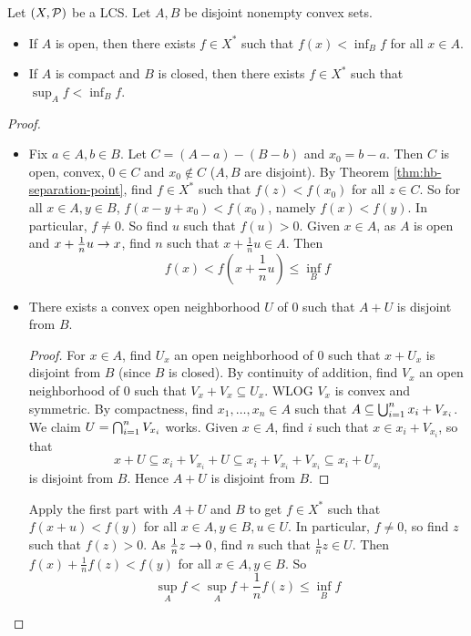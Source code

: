 \documentclass{article}
\begin{document}
\begin{nthm}\label{thm:hb-separation-set}
  Let $(X, \mathcal P)$ be a LCS. Let $A, B$ be disjoint nonempty convex sets.
  \begin{itemize}
    \item If $A$ is open, then there exists $f \in X^*$ such that $f(x) < \inf_B f$ for all $x \in A$.
    \item If $A$ is compact and $B$ is closed, then there exists $f \in X^*$ such that $\sup_A f < \inf_B f$.
  \end{itemize}
\end{nthm}
\begin{proof}~
  \begin{itemize}
    \item Fix $a \in A, b \in B$. Let $C = (A - a) - (B - b)$ and $x_0 = b - a$. Then $C$ is open, convex, $0 \in C$ and $x_0 \nin C$ ($A, B$ are disjoint). By Theorem \ref{thm:hb-separation-point}, find $f \in X^*$ such that $f(z) < f(x_0)$ for all $z \in C$. So for all $x \in A, y \in B$, $f(x - y + x_0) < f(x_0)$, namely $f(x) < f(y)$. In particular, $f \ne 0$. So find $u$ such that $f(u) > 0$. Given $x \in A$, as $A$ is open and $x + \frac 1n u \rightarrow x$, find $n$ such that $x + \frac 1n u \in A$. Then
    $$f(x) < f\left(x + \frac 1n u\right) \le \inf_B f$$
  \item
  \begin{claim}
    There exists a convex open neighborhood $U$ of $0$ such that $A + U$ is disjoint from $B$.
  \end{claim}
  \begin{proof}
    For $x \in A$, find $U_x$ an open neighborhood of $0$ such that $x + U_x$ is disjoint from $B$ (since $B$ is closed). By continuity of addition, find $V_x$ an open neighborhood of $0$ such that $V_x + V_x \subseteq U_x$. WLOG $V_x$ is convex and symmetric. By compactness, find $x_1, \dots, x_n \in A$ such that $A \subseteq \bigcup_{i = 1}^n x_i + V_{x_i}$. We claim $U = \bigcap_{i = 1}^n V_{x_i}$ works. Given $x \in A$, find $i$ such that $x \in x_i + V_{x_i}$, so that
    $$x + U \subseteq x_i + V_{x_i} + U \subseteq x_i + V_{x_i} + V_{x_i} \subseteq x_i + U_{x_i}$$
    is disjoint from $B$. Hence $A + U$ is disjoint from $B$.
  \end{proof}
  Apply the first part with $A + U$ and $B$ to get $f \in X^*$ such that $f(x + u) < f(y)$ for all $x \in A, y \in B, u \in U$. In particular, $f \ne 0$, so find $z$ such that $f(z) > 0$. As $\frac 1n z \rightarrow 0$, find $n$ such that $\frac 1n z \in U$. Then $f(x) + \frac 1n f(z) < f(y)$ for all $x \in A, y \in B$. So
  $$\sup_A f < \sup_A f + \frac 1n f(z) \le \inf_B f$$
  \end{itemize}
\end{proof}
\end{document}

